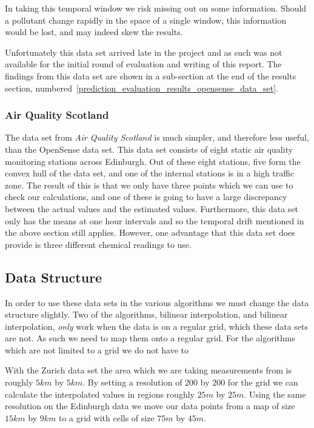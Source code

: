 				In taking this temporal window we risk missing out on some information. Should a pollutant change rapidly in the space of a single window, this information would be lost, and may indeed skew the results. 

				Unfortunately this data set arrived late in the project and as such was not available for the initial round of evaluation and writing of this report. The findings from this data set are shown in a sub-section at the end of the results section, numbered~\ref{prediction_evaluation_results_opensense_data_set}.


			\subsubsection{Air Quality Scotland}\label{prediction_evaluation_methodology_data_sets_air_quality_scotland}

				The data set from \emph{Air Quality Scotland} is much simpler, and therefore less useful, than the OpenSense data set. This data set consists of eight static air quality monitoring stations across Edinburgh. Out of these eight stations, five form the convex hull of the data set, and one of the internal stations is in a high traffic zone. The result of this is that we only have three points which we can use to check our calculations, and one of these is going to have a large discrepancy between the actual values and the estimated values. Furthermore, this data set only has the means at one hour intervals and so the temporal drift mentioned in the above section still applies. However, one advantage that this data set does provide is three different chemical readings to use. 

		\subsection{Data Structure}\label{prediction_evaluation_methodology_data_structure}
			
			In order to use these data sets in the various algorithms we must change the data structure slightly. Two of the algorithms, bilinear interpolation, and bilinear interpolation, \emph{only} work when the data is on a regular grid, which these data sets are not. As such we need to map them onto a regular grid. For the algorithms which are not limited to a grid we do not have to

			With the Zurich data set the area which we are taking measurements from is roughly $5km$ by $5km$. By setting a resolution of 200 by 200 for the grid we can calculate the interpolated values in regions roughly $25m$ by $25m$. Using the same resolution on the Edinburgh data we move our data points from a map of size $15km$ by $9km$ to a grid with cells of size $75m$ by $45m$. 


